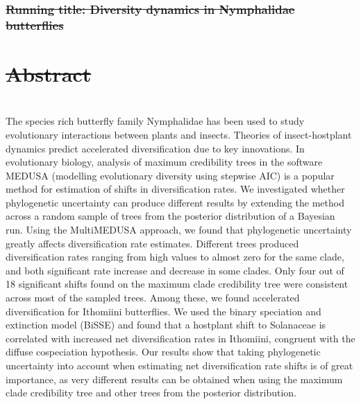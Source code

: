 \documentclass[10pt,letterpaper]{article} %
\providecommand{\DIFadd}[1]{{\protect\color{blue}\uwave{#1}}} %
\providecommand{\DIFdel}[1]{{\protect\color{red}\sout{#1}}}                      %
\providecommand{\DIFaddbegin}{} %
\providecommand{\DIFaddend}{} %
\providecommand{\DIFdelbegin}{} %
\providecommand{\DIFdelend}{} %
\begin{document}
\begin{flushleft}
\DIFdelbegin %
\DIFdelend %

\DIFdelbegin \subsubsection*{\DIFdel{Running title: Diversity dynamics in Nymphalidae
butterflies}}
\DIFdelend %

\DIFdelbegin \section*{\DIFdel{Abstract}}
\DIFdelend \DIFaddbegin \DIFadd{* E-mail: mycalesis@gmail.com
}\end{flushleft}
\DIFaddend 

\DIFaddbegin \section*{\DIFadd{Abstract}}
\DIFaddend The species rich butterfly family Nymphalidae has been used to study
evolutionary interactions between plants and insects. Theories of
insect-hostplant dynamics predict accelerated diversification due to key
innovations. In evolutionary biology, analysis of maximum credibility
trees in the software MEDUSA (modelling evolutionary diversity using
stepwise AIC) is a popular method for estimation of shifts in
diversification rates. We investigated whether phylogenetic uncertainty
can produce different results by extending the method across a random
sample of trees from the posterior distribution of a Bayesian run. Using
the MultiMEDUSA approach, we found that phylogenetic uncertainty greatly
affects diversification rate estimates. Different trees produced
diversification rates ranging from high values to almost zero for the
same clade, and both significant rate increase and decrease in some
clades. Only four out of 18 significant shifts found on the maximum
clade credibility tree were consistent across most of the sampled trees.
Among these, we found accelerated diversification for Ithomiini
butterflies. We used the binary speciation and extinction model (BiSSE)
and found that a hostplant shift to Solanaceae is correlated with
increased net diversification rates in Ithomiini, congruent with the
diffuse cospeciation hypothesis. Our results show that taking
phylogenetic uncertainty into account when estimating net
diversification rate shifts is of great importance, as very different
results can be obtained when using the maximum clade credibility tree
and other trees from the posterior distribution.
\end{document}

